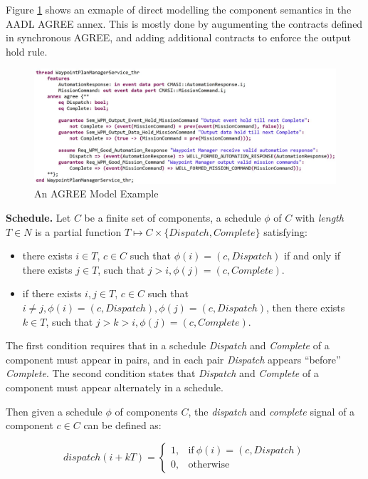 Figure \ref{wpmAGREE} shows an exmaple of direct modelling the component semantics in the AADL AGREE annex. This is mostly done by augumenting the contracts defined in synchronous AGREE, and adding additional contracts to enforce the output hold rule.

\begin{figure}[ht!]
\centering
\includegraphics[width=130mm]{wpmAGREE.jpg}
\caption{An AGREE Model Example\label{wpmAGREE}}
\end{figure}

{\bf Schedule.}
Let $C$ be a finite set of components, a schedule $\phi$ of $C$ with \emph{length} $T\in N$ is a partial function $T \mapsto C\times \{Dispatch, Complete\}$ satisfying:
\begin{itemize}
	\item there exists $i\in T$, $c\in C$ such that $\phi(i) = (c, Dispatch)$ if and only if there exists $j\in T$, such that $j > i, \phi(j) =  (c, Complete)$.
	\item if there exists $i, j\in T$, $c\in C$ such that $i \neq j, \phi(i) = (c, Dispatch), \phi(j) = (c, Dispatch)$, then there exists $k\in T$, such that $j >k> i, \phi(j) =  (c, Complete)$.
\end{itemize}
The first condition requires that in a schedule \emph{Dispatch} and \emph{Complete} of a component must appear in pairs, and in each pair \emph{Dispatch} appears ``before'' \emph{Complete}. The second condition states that \emph{Dispatch} and \emph{Complete} of a component must appear alternately in a schedule. 

Then given a schedule $\phi$ of components $C$, the \emph{dispatch} and \emph{complete} signal of a component $c \in C$ can be defined as:
  
\begin{equation}
\label{eqn:dispatch}
    dispatch(i+kT) =
    \begin{cases}
      1, & \text{if}\ \phi(i) = (c, Dispatch) \\
      0, & \text{otherwise}
    \end{cases}
\end{equation}

